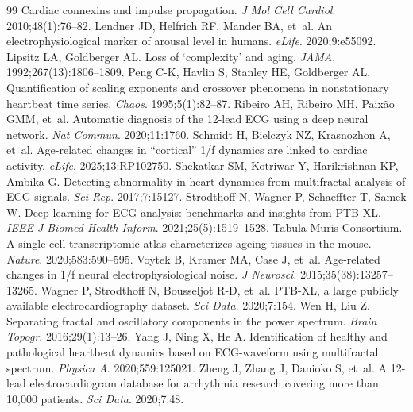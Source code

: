 \documentclass[11pt,a4paper]{article}
\begin{document}
\begin{thebibliography}{99}
\newblock Cardiac connexins and impulse propagation.
\newblock \textit{J Mol Cell Cardiol}. 2010;48(1):76--82.
Lendner JD, Helfrich RF, Mander BA, et~al.
\newblock An electrophysiological marker of arousal level in humans.
\newblock \textit{eLife}. 2020;9:e55092.
Lipsitz LA, Goldberger AL.
\newblock Loss of `complexity' and aging.
\newblock \textit{JAMA}. 1992;267(13):1806--1809.
Peng C-K, Havlin S, Stanley HE, Goldberger AL.
\newblock Quantification of scaling exponents and crossover phenomena in nonstationary heartbeat time series.
\newblock \textit{Chaos}. 1995;5(1):82--87.
Ribeiro AH, Ribeiro MH, Paix\~{a}o GMM, et~al.
\newblock Automatic diagnosis of the 12-lead ECG using a deep neural network.
\newblock \textit{Nat Commun}. 2020;11:1760.
Schmidt H, Bielczyk NZ, Krasnozhon A, et~al.
\newblock Age-related changes in ``cortical'' 1/f dynamics are linked to cardiac activity.
\newblock \textit{eLife}. 2025;13:RP102750.
Shekatkar SM, Kotriwar Y, Harikrishnan KP, Ambika G.
\newblock Detecting abnormality in heart dynamics from multifractal analysis of ECG signals.
\newblock \textit{Sci Rep}. 2017;7:15127.
Strodthoff N, Wagner P, Schaeffter T, Samek W.
\newblock Deep learning for ECG analysis: benchmarks and insights from PTB-XL.
\newblock \textit{IEEE J Biomed Health Inform}. 2021;25(5):1519--1528.
Tabula Muris Consortium.
\newblock A single-cell transcriptomic atlas characterizes ageing tissues in the mouse.
\newblock \textit{Nature}. 2020;583:590--595.
Voytek B, Kramer MA, Case J, et~al.
\newblock Age-related changes in 1/f neural electrophysiological noise.
\newblock \textit{J Neurosci}. 2015;35(38):13257--13265.
Wagner P, Strodthoff N, Bousseljot R-D, et~al.
\newblock PTB-XL, a large publicly available electrocardiography dataset.
\newblock \textit{Sci Data}. 2020;7:154.
Wen H, Liu Z.
\newblock Separating fractal and oscillatory components in the power spectrum.
\newblock \textit{Brain Topogr}. 2016;29(1):13--26.
Yang J, Ning X, He A.
\newblock Identification of healthy and pathological heartbeat dynamics based on ECG-waveform using multifractal spectrum.
\newblock \textit{Physica A}. 2020;559:125021.
Zheng J, Zhang J, Danioko S, et~al.
\newblock A 12-lead electrocardiogram database for arrhythmia research covering more than 10,000 patients.
\newblock \textit{Sci Data}. 2020;7:48.
\end{thebibliography}
\newpage
\end{document}
